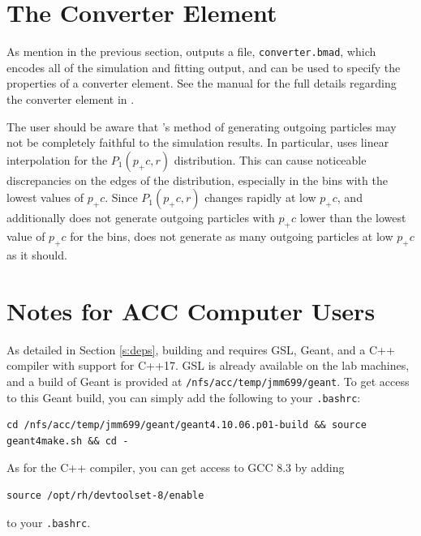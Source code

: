 \documentclass[12pt]{article}
\begin{document}
\section{The \bmad  Converter Element}

As mention in the previous section, \exef outputs a file, \texttt{converter.bmad}, which encodes all
of the simulation and fitting output, and can be used to specify the properties of a \bmad converter
element.  See the \bmad manual for the full details regarding the converter element in \bmad.

The user should be aware that \bmad's method of generating outgoing particles may not be completely
faithful to the simulation results.  In particular, \bmad uses linear interpolation for the
$P_1(p_+c, r)$ distribution.  This can cause noticeable discrepancies on the edges of the
distribution, especially in the bins with the lowest values of $p_+ c$.  Since $P_1(p_+c, r)$
changes rapidly at low $p_+ c$, and \bmad additionally does not generate outgoing particles with
$p_+ c$ lower than the lowest value of $p_+ c$ for the bins, \bmad does not generate as many
outgoing particles at low $p_+ c$ as it should.


\appendix

\section{Notes for ACC Computer Users}

As detailed in Section \ref{s:deps}, building \exes and \exef requires GSL, Geant, and a C++
compiler with support for C++17.  GSL is already available on the lab machines, and a build of Geant
is provided at \texttt{/nfs/acc/temp/jmm699/geant}.  To get access to this Geant build, you can
simply add the following to your \texttt{.bashrc}:
\begin{verbatim}
cd /nfs/acc/temp/jmm699/geant/geant4.10.06.p01-build && source geant4make.sh && cd -
\end{verbatim}
As for the C++ compiler, you can get access to GCC 8.3 by adding
\begin{verbatim}
source /opt/rh/devtoolset-8/enable
\end{verbatim}
to your \texttt{.bashrc}.








\printbibliography
\end{document}
